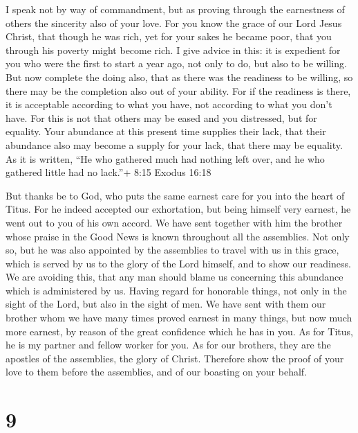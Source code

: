  I speak not by way of commandment, but as proving through
the earnestness of others the sincerity also of your love. 
For you know the grace of our Lord Jesus Christ, that though he was
rich, yet for your sakes he became poor, that you through his poverty
might become rich.  I give advice in this: it is expedient
for you who were the first to start a year ago, not only to do, but also
to be willing.  But now complete the doing also, that as
there was the readiness to be willing, so there may be the completion
also out of your ability.  For if the readiness is there,
it is acceptable according to what you have, not according to what you
don't have.  For this is not that others may be eased and
you distressed,  but for equality. Your abundance at this
present time supplies their lack, that their abundance also may become a
supply for your lack, that there may be equality.  As it is
written, ``He who gathered much had nothing left over, and he who
gathered little had no lack.''+ 8:15 Exodus 16:18

 But thanks be to God, who puts the same earnest care for
you into the heart of Titus.  For he indeed accepted our
exhortation, but being himself very earnest, he went out to you of his
own accord.  We have sent together with him the brother
whose praise in the Good News is known throughout all the assemblies.
 Not only so, but he was also appointed by the assemblies
to travel with us in this grace, which is served by us to the glory of
the Lord himself, and to show our readiness.  We are
avoiding this, that any man should blame us concerning this abundance
which is administered by us.  Having regard for honorable
things, not only in the sight of the Lord, but also in the sight of men.
 We have sent with them our brother whom we have many times
proved earnest in many things, but now much more earnest, by reason of
the great confidence which he has in you.  As for Titus, he
is my partner and fellow worker for you. As for our brothers, they are
the apostles of the assemblies, the glory of Christ. 
Therefore show the proof of your love to them before the assemblies, and
of our boasting on your behalf.

\hypertarget{section-8}{%
\section{9}\label{section-8}}

